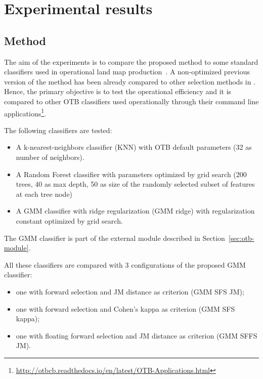 \documentclass[journal]{IEEEtran}
\begin{document}
\section{Experimental results}
\label{sec:test}

    \subsection{Method}
    \label{sec:method}

    The aim  of the experiments is  to compare the proposed  method to
    some   standard  classifiers   used   in   operational  land   map
    production~\cite{rs70912356}. A non-optimized  previous version of
    the method has been already compared to other selection methods in
    \cite{fauvel2015fast}.  Hence,  the primary  objective is  to test
    the  operational  efficiency  and  it is  compared  to  other  OTB
    classifiers   used  operationally   through  their   command  line
    applications\footnote{\url{http://otbcb.readthedocs.io/en/latest/OTB-Applications.html}}.

    The following classifiers are tested:
    \begin{itemize}
        \item A k-nearest-neighbors classifier (KNN) with OTB default parameters (32 as number of neighbors).
        \item A Random Forest classifier with parameters optimized by grid search (200 trees, 40 as max depth, 50 as size of the randomly selected subset of features at each tree node)
        \item A GMM classifier with ridge regularization (GMM ridge) with regularization constant optimized by grid search.
    \end{itemize}
    The GMM classifier is part of the external module described in Section~\ref{sec:otb-module}.

    All these classifiers are compared with 3 configurations of the proposed GMM classifier:
    \begin{itemize}
        \item one with forward selection and JM distance as criterion (GMM SFS JM);
        \item one with forward selection and Cohen's kappa as criterion (GMM SFS kappa);
        \item one with floating forward selection and JM distance as criterion (GMM SFFS JM).
    \end{itemize}
\end{document}
